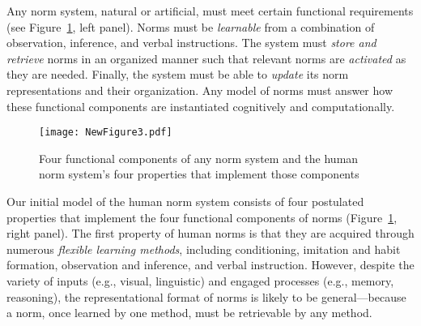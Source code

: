 \documentclass[12pt]{article}
\begin{document}


\vskip 0.1in
\vskip 0.1in

\noindent Any norm system, natural or artificial, must meet certain
functional requirements (see Figure~\ref{fig:fourfunctional}, left panel). Norms
must be {\em learnable} from a combination of observation, inference,
and verbal instructions.  The system must {\em store and retrieve} norms in
an organized manner such that relevant norms are {\em activated} as
they are needed.  Finally, the system must be able to {\em update} its
norm representations and their organization.  Any model of norms must answer how
these functional components are instantiated cognitively and
computationally.
\vskip 0.1in

\begin{figure}[h!]
\centering
\texttt{[image: NewFigure3.pdf]}
 \caption{\small Four functional components of any norm system and the human norm system's four properties that implement those components}
  \label{fig:fourfunctional}

  \end{figure}

\vskip 0.1in
\vskip 0.1in

\noindent Our initial model of the human norm system consists of four
postulated properties that implement the four functional components
of norms (Figure~\ref{fig:fourfunctional}, right panel). The first property of
human norms is that they are acquired through numerous {\em
  flexible learning methods}, including conditioning, imitation and habit formation,
observation and inference, and verbal instruction.  However, despite the variety of inputs  (e.g., visual, linguistic) and engaged processes (e.g., memory, reasoning), the representational format of norms is likely to be general---because a norm, once learned by one method, must be retrievable by any method.    
\end{document}
